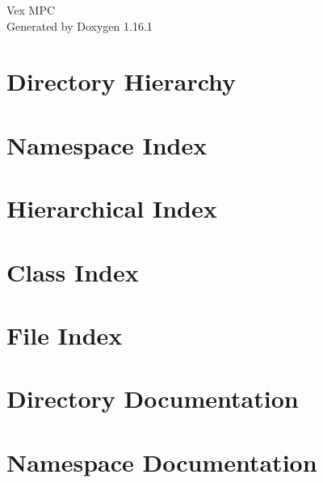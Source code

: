 \documentclass[twoside]{book}
\newcommand{\+}{\discretionary{\mbox{\scriptsize$\hookleftarrow$}}{}{}}
\newcommand{\clearemptydoublepage}{%
    \newpage{\pagestyle{empty}\cleardoublepage}%
  }
\begin{document}
  \raggedbottom
    \hypersetup{pageanchor=false,
                bookmarksnumbered=true,
                pdfencoding=unicode
               }
  \begin{titlepage}
  \vspace*{7cm}
  \begin{center}%
  {\Large Vex MPC}\\
  \vspace*{1cm}
  {\large Generated by Doxygen 1.16.1}\\
  \end{center}
  \end{titlepage}
  \clearemptydoublepage
  \tableofcontents
  \clearemptydoublepage
  \hypersetup{pageanchor=true}
\chapter{Directory Hierarchy}

\chapter{Namespace Index}

\chapter{Hierarchical Index}

\chapter{Class Index}

\chapter{File Index}

\chapter{Directory Documentation}








\chapter{Namespace Documentation}

\end{document}
